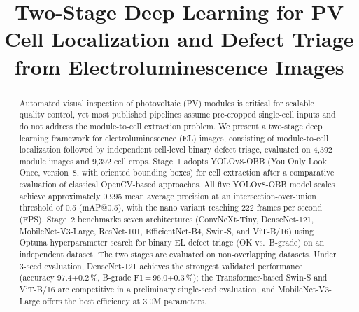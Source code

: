 \documentclass[conference]{IEEEtran}
\begin{document}
\title{Two-Stage Deep Learning for PV Cell Localization and Defect Triage from Electroluminescence Images%
}


\maketitle

\begin{abstract}
Automated visual inspection of photovoltaic (PV) modules is critical for scalable quality control, yet most published pipelines assume pre-cropped single-cell inputs and do not address the module-to-cell extraction problem. We present a two-stage deep learning framework for electroluminescence (EL) images, consisting of module-to-cell localization followed by independent cell-level binary defect triage, evaluated on 4{,}392 module images and 9{,}392 cell crops. Stage~1 adopts YOLOv8-OBB (You Only Look Once, version~8, with oriented bounding boxes) for cell extraction after a comparative evaluation of classical OpenCV-based approaches. All five YOLOv8-OBB model scales achieve approximately 0.995 mean average precision at an intersection-over-union threshold of 0.5 (mAP@0.5), with the nano variant reaching 222 frames per second (FPS). Stage~2 benchmarks seven architectures (ConvNeXt-Tiny, DenseNet-121, MobileNet-V3-Large, ResNet-101, EfficientNet-B4, Swin-S, and ViT-B/16) using Optuna hyperparameter search for binary EL defect triage (OK vs.\ B-grade) on an independent dataset. The two stages are evaluated on non-overlapping datasets. Under 3-seed evaluation, DenseNet-121 achieves the strongest validated performance (accuracy 97.4$\pm$0.2\,\%, B-grade F1\,=\,96.0$\pm$0.3\,\%); the Transformer-based Swin-S and ViT-B/16 are competitive in a preliminary single-seed evaluation, and MobileNet-V3-Large offers the best efficiency at 3.0M parameters.
\end{abstract}
\end{document}
